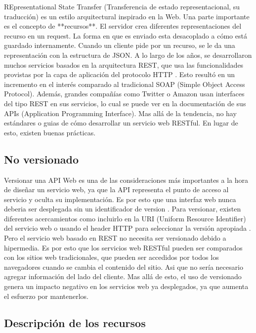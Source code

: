 REpresentational State Transfer (Transferencia de estado representacional, su traducción) es un estilo arquitectural inspirado en la Web. 
Una parte importante es el concepto de **recursos**. 
El servidor crea diferentes representaciones del recurso en un request. La forma en que es enviado esta desacoplado a cómo está guardado internamente. Cuando un cliente pide por un recurso, se le da una representación con la estructura de JSON.
A lo largo de los años, se desarrollaron muchos servicios basados en la arquitectura REST, que usa las funcionalidades provistas por la capa de aplicación del protocolo HTTP \cite{RestSoap} \cite{IETF}. Esto resultó en un incremento en el interés comparado al tradicional SOAP (Simple Object Access Protocol). Además, grandes compañías como Twitter o Amazon usan interfaces del tipo REST en sus servicios, lo cual se puede ver en la documentación de sus APIs (Application Programming Interface).
Mas allá de la tendencia, no hay estándares o guias de cómo desarrollar un servicio web RESTful. En lugar de esto, existen buenas prácticas.

\subsection[No versionado]{No versionado}

Versionar una API Web es una de las consideraciones más importantes a la hora de diseñar un servicio web, ya que la API representa el punto de acceso al servicio y oculta su implementación. Es por esto que una interfaz web nunca deberia ser desplegada sin un identificador de version \cite{WAPID}. Para versionar, existen diferentes acercamientos como incluirlo en la URI (Uniform Resource Identifier) del servicio web o usando el header HTTP para seleccionar la versión apropiada \cite{WAPID}. Pero el servicio web basado en REST no necesita ser versionado debido a hipermedia. Es por esto que los servicios web RESTful pueden ser comparados con los sitios web tradicionales, que pueden ser accedidos por todos los navegadores cuando se cambia el contenido del sitio. Asi que no sería necesario agregar información del lado del cliente.
Mas allá de esto, el uso de versionado genera un impacto negativo en los servicios web ya desplegados, ya que aumenta el esfuerzo por mantenerlos.


\subsection[Descripción de los recursos]{Descripción de los recursos}

